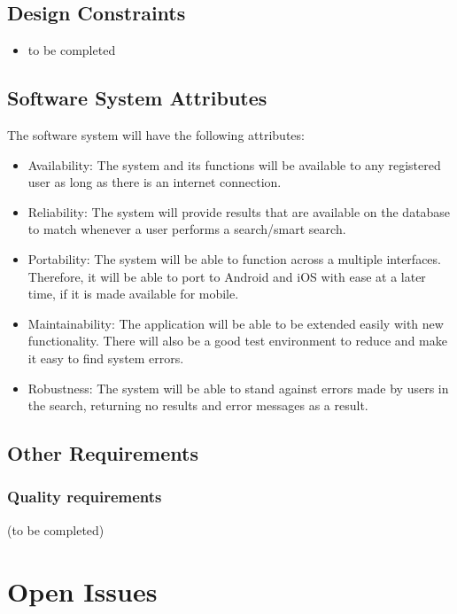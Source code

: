 \documentclass[a4paper,10pt]{article}
\begin{document}
	\subsection{Design Constraints}
	\begin{itemize}
		\item to be completed
	\end{itemize}

	\subsection{Software System Attributes}
	The software system will have the following attributes:
		\begin{itemize}
		\item Availability: The system and its functions will be available to any registered user as long as there is an internet connection. 
		\item Reliability: The system will provide results that are available on the database to match whenever a user performs a search/smart search.
		\item Portability: The system will be able to function across a multiple interfaces. Therefore, it will be able to port to Android and iOS with ease at a later time, if it is made available for mobile.   
		\item Maintainability: The application will be able to be extended easily with new functionality. There will also be a good test environment to reduce and make it easy to find system errors.  
		\item Robustness: The system will be able to stand against errors made by users in the search, returning no results and error messages as a result.
		\end{itemize}
        
	\subsection{Other Requirements}

\subsubsection{Quality requirements}
(to be completed)




\clearpage

\section{Open Issues}
\end{document}
